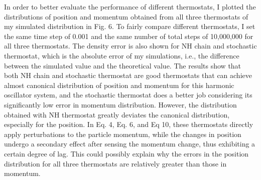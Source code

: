 \documentclass{article}
\begin{document}
In order to better evaluate the performance of different thermostats, I plotted the distributions of position and momentum obtained from all three thermostats of my simulated distribution in Fig. 6. To fairly compare different thermostats, I set the same time step of 0.001 and the same number of total steps of 10,000,000 for all three thermostats. The density error is also shown for NH chain and stochastic thermostat, which is the absolute error of my simulations, i.e., the difference between the simulated value and the theoretical value. The results show that both NH chain and stochastic thermostat are good thermostats that can achieve almost canonical distribution of position and momentum for this harmonic oscillator system, and the stochastic thermostat does a better job considering its significantly low error in momentum distribution. However, the distribution obtained with NH thermostat greatly deviates the canonical distribution, especially for the position. In Eq. 4, Eq. 6, and Eq 10, these thermostats directly apply perturbations to the particle momentum, while the changes in position undergo a secondary effect after sensing the momentum change, thus exhibiting a certain degree of lag. This could possibly explain why the errors in the position distribution for all three thermostats are relatively greater than those in momentum.
\end{document}
